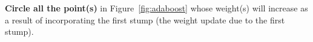 \item {} \textbf{Circle all the point(s)} in Figure~\ref{fig:adaboost} whose weight(s) will increase as a result of incorporating the first stump (the weight update due to the first stump). 	